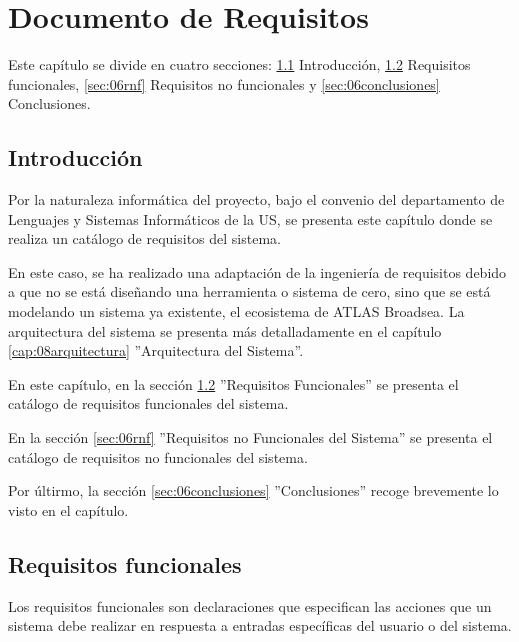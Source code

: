 \chapter{Documento de Requisitos}\label{cap:06requisitos}

Este capítulo se divide en cuatro secciones: \ref{sec:06intro} Introducción, \ref{sec:06rf} Requisitos funcionales, \ref{sec:06rnf} Requisitos no funcionales y \ref{sec:06conclusiones} Conclusiones.

\section{Introducción} \label{sec:06intro}

Por la naturaleza informática del proyecto, bajo el convenio del departamento de Lenguajes y Sistemas Informáticos de la US, se presenta este capítulo donde se realiza un catálogo de requisitos del sistema.

En este caso, se ha realizado una adaptación de la ingeniería de requisitos debido a que no se está diseñando una herramienta o sistema de cero, sino que se está modelando un sistema ya existente, el ecosistema de ATLAS Broadsea. La arquitectura del sistema se presenta más detalladamente en el capítulo \ref{cap:08arquitectura} ''Arquitectura del Sistema''.

En este capítulo, en la sección \ref{sec:06rf} ''Requisitos Funcionales'' se presenta el catálogo de requisitos funcionales del sistema.

En la sección \ref{sec:06rnf} ''Requisitos no Funcionales del Sistema'' se presenta el catálogo de requisitos no funcionales del sistema.

Por últirmo, la sección \ref{sec:06conclusiones} ''Conclusiones'' recoge brevemente lo visto en el capítulo.



\section{Requisitos funcionales} \label{sec:06rf}

Los requisitos funcionales son declaraciones que especifican las acciones que un sistema debe realizar en respuesta a entradas específicas del usuario o del sistema. 


